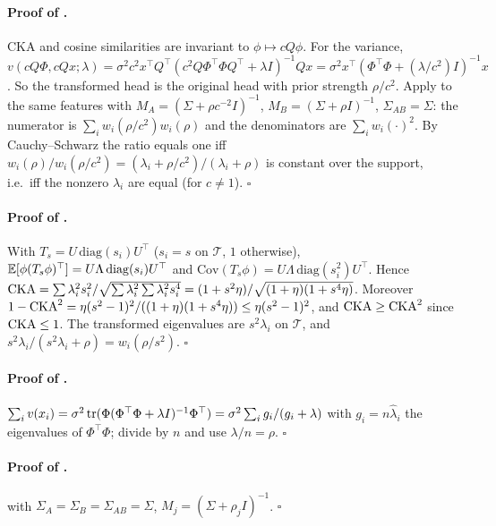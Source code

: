 \paragraph{Proof of .}
CKA and cosine similarities are invariant to $\phi\mapsto cQ\phi$. For the variance,
$v(cQ\Phi,cQx;\lambda)=\sigma^2c^2x^\top Q^\top(c^2Q\Phi^\top\Phi Q^\top+\lambda I)^{-1}Qx=\sigma^2x^\top(\Phi^\top\Phi+(\lambda/c^2)I)^{-1}x$.
So the transformed head is the original head with prior strength $\rho/c^2$. Apply  to the same features with $M_A=(\Sigma+\rho c^{-2}I)^{-1}$, $M_B=(\Sigma+\rho I)^{-1}$, $\Sigma_{AB}=\Sigma$: the numerator is $\sum_iw_i(\rho/c^2)w_i(\rho)$ and the denominators are $\sum_iw_i(\cdot)^2$. By Cauchy--Schwarz the ratio equals one iff $w_i(\rho)/w_i(\rho/c^2)=(\lambda_i+\rho/c^2)/(\lambda_i+\rho)$ is constant over the support, i.e.\ iff the nonzero $\lambda_i$ are equal (for $c\ne1$). \hfill$\square$

\paragraph{Proof of .}
With $T_s=U\,\mathrm{diag}(s_i)U^\top$ ($s_i=s$ on $\mathcal T$, $1$ otherwise), $\mathbb{E}[\phi(T_s\phi)^\top]=U\Lambda\,\mathrm{diag}(s_i)U^\top$ and $\mathrm{Cov}(T_s\phi)=U\Lambda\,\mathrm{diag}(s_i^2)U^\top$. Hence
$\operatorname{CKA}=\sum\lambda_i^2s_i^2/\sqrt{\sum\lambda_i^2\sum\lambda_i^2s_i^4}=(1+s^2\eta)/\sqrt{(1+\eta)(1+s^4\eta)}$.
Moreover $1-\operatorname{CKA}^2=\eta(s^2-1)^2/((1+\eta)(1+s^4\eta))\le\eta(s^2-1)^2$, and $\operatorname{CKA}\ge\operatorname{CKA}^2$ since $\operatorname{CKA}\le1$. The transformed eigenvalues are $s^2\lambda_i$ on $\mathcal T$, and $s^2\lambda_i/(s^2\lambda_i+\rho)=w_i(\rho/s^2)$. \hfill$\square$

\paragraph{Proof of .}
$\sum_iv(x_i)=\sigma^2\operatorname{tr}(\Phi(\Phi^\top\Phi+\lambda I)^{-1}\Phi^\top)=\sigma^2\sum_ig_i/(g_i+\lambda)$ with $g_i=n\hat\lambda_i$ the eigenvalues of $\Phi^\top\Phi$; divide by $n$ and use $\lambda/n=\rho$. \hfill$\square$

\paragraph{Proof of .}  with $\Sigma_A=\Sigma_B=\Sigma_{AB}=\Sigma$, $M_j=(\Sigma+\rho_jI)^{-1}$. \hfill$\square$

